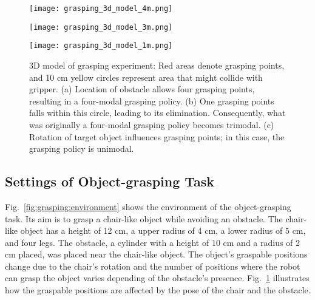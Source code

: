 \documentclass[sn-mathphys-num]{sn-jnl}
\begin{document}
\begin{figure}[t]
    \begin{minipage}[b]{0.32\linewidth}
        \centering
        \texttt{[image: grasping\_3d\_model\_4m.png]}
        \subcaption{}
        \label{fig:grasping:3d_model:a}
    \end{minipage}
    \begin{minipage}[b]{0.32\linewidth}
        \centering
        \texttt{[image: grasping\_3d\_model\_3m.png]}
        \subcaption{}
        \label{fig:grasping:3d_model:b}
    \end{minipage}
    \begin{minipage}[b]{0.32\linewidth}
        \centering
        \texttt{[image: grasping\_3d\_model\_1m.png]}
        \subcaption{}
        \label{fig:grasping:3d_model:c}
    \end{minipage}
    \vspace{-0mm}
    \caption{3D model of grasping experiment: Red areas denote grasping points, and 10 cm yellow circles represent area that might collide with gripper.
    (a) Location of obstacle allows four grasping points, resulting in a four-modal grasping policy.
    (b) One grasping points falls within this circle, leading to its elimination. Consequently, what was originally a four-modal grasping policy becomes trimodal.
    (c) Rotation of target object influences grasping points; in this case, the grasping policy is unimodal.}
    \label{fig:grasping:3d_model}
\end{figure}

\subsection{Settings of Object-grasping Task}
Fig.~\ref{fig:grasping:environment} shows the environment of the object-grasping task.
Its aim is to grasp a chair-like object while avoiding an obstacle.
The chair-like object has a height of 12 cm, a upper radius of 4 cm, a lower radius of 5 cm, and four legs.
The obstacle, a cylinder with a height of 10 cm and a radius of 2 cm placed, was placed near the chair-like object.
The object's graspable positions change due to the chair's rotation and the number of positions where the robot can grasp the object varies depending of the obstacle's presence.
Fig.~\ref{fig:grasping:3d_model} illustrates how the graspable positions are affected by the pose of the chair and the obstacle.
\end{document}
